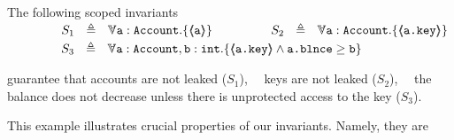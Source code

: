 \begin{example}
\label{s:bankSpecEx}
The following scoped invariants\\
$\strut \SPSP\ \ \   S_1\ \  \triangleq \ \ \TwoStatesN {\prg{a}:\prg{Account}}  {\inside{\prg{a}}} $ 
\hspace{1.1cm}
$\strut  \SPSP\ \ \   S_2\ \  \triangleq \ \ \TwoStatesN  {\prg{a}:\prg{Account}}  {\inside{\prg{a.key}}} $ 
\\
$\strut  \SPSP\ \ \   S_3\ \  \triangleq \ \ \TwoStatesN{ \prg{a}:\prg{Account},\prg{b}:\prg{int} } {\inside{\prg{a.key}} \wedge \prg{a.\balance} \geq \prg{b} } $ 

\noindent
 guarantee that   accounts are not leaked  ($S_1$), \ \ keys are not leaked  ($S_2$), \ \ the balance does not decrease unless there is unprotected access to the key  ($S_3$).
%
\end{example} 

 
\noindent
This example illustrates  crucial properties of our   invariants. Namely, they are


